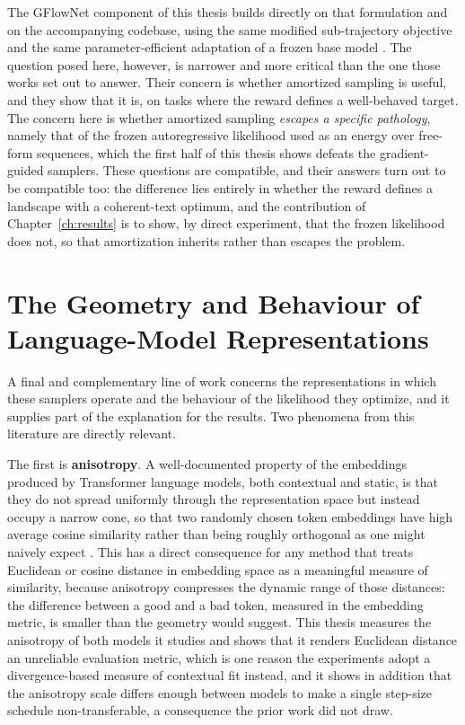 The GFlowNet component of this thesis builds directly on that formulation and on the accompanying codebase, using the same modified sub-trajectory objective and the same parameter-efficient adaptation of a frozen base model \citep{hu2022lora}. The question posed here, however, is narrower and more critical than the one those works set out to answer. Their concern is whether amortized sampling is useful, and they show that it is, on tasks where the reward defines a well-behaved target. The concern here is whether amortized sampling \emph{escapes a specific pathology}, namely that of the frozen autoregressive likelihood used as an energy over free-form sequences, which the first half of this thesis shows defeats the gradient-guided samplers. These questions are compatible, and their answers turn out to be compatible too: the difference lies entirely in whether the reward defines a landscape with a coherent-text optimum, and the contribution of Chapter~\ref{ch:results} is to show, by direct experiment, that the frozen likelihood does not, so that amortization inherits rather than escapes the problem.

\section{The Geometry and Behaviour of Language-Model Representations}
\label{sec:rel-geometry}

A final and complementary line of work concerns the representations in which these samplers operate and the behaviour of the likelihood they optimize, and it supplies part of the explanation for the results. Two phenomena from this literature are directly relevant.

The first is \textbf{anisotropy}. A well-documented property of the embeddings produced by Transformer language models, both contextual and static, is that they do not spread uniformly through the representation space but instead occupy a narrow cone, so that two randomly chosen token embeddings have high average cosine similarity rather than being roughly orthogonal as one might naively expect \citep{gao2019representation, ethayarajh2019contextual}. This has a direct consequence for any method that treats Euclidean or cosine distance in embedding space as a meaningful measure of similarity, because anisotropy compresses the dynamic range of those distances: the difference between a good and a bad token, measured in the embedding metric, is smaller than the geometry would suggest. This thesis measures the anisotropy of both models it studies and shows that it renders Euclidean distance an unreliable evaluation metric, which is one reason the experiments adopt a divergence-based measure of contextual fit instead, and it shows in addition that the anisotropy scale differs enough between models to make a single step-size schedule non-transferable, a consequence the prior work did not draw.

